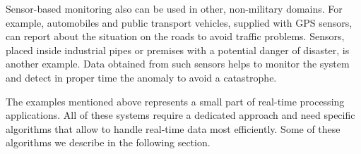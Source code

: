 Sensor-based monitoring also can be used in other, non-military domains.
For example, automobiles and public transport vehicles, supplied with GPS sensors, can report about the situation on the roads to avoid traffic problems. 
Sensors, placed inside industrial pipes or premises with a potential danger of disaster, is another example.
Data obtained from such sensors helps to monitor the system and detect in proper time the anomaly to avoid a catastrophe.
 
The examples mentioned above represents a small part of real-time processing applications.
All of these systems require a dedicated approach and need specific algorithms that allow to handle real-time data most efficiently.
Some of these algorithms we describe in the following section.

